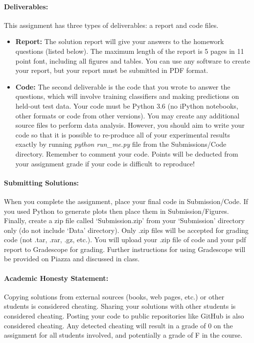 \documentclass[letterpaper]{article}
\begin{document}
\paragraph*{Deliverables:} This assignment has three types of deliverables: a report and code files. 
\begin{itemize}
\item \textbf{Report: } The solution report will give your answers to the homework questions (listed below). The maximum length of the report is 5 pages in 11 point font, including all figures and tables. You can use any software to create your report, but your report must be submitted in PDF format. 

\item \textbf{Code: } The second deliverable is the code that you wrote to answer the questions, which will involve training classifiers and making predictions on held-out test data. Your code must be Python 3.6 (no iPython notebooks, other formats or code from other versions). You may create any additional source files to perform data analysis. However, you should aim to write your code so that it is possible to re-produce all of your experimental results exactly by running \textit{python run\_me.py} file from the Submissions/Code directory. Remember to comment your code. Points will be deducted from your assignment grade if your code is difficult to reproduce!

\end{itemize}

\paragraph*{Submitting Solutions:} When you complete the assignment, place your final code in Submission/Code. If you used Python to generate plots then place them in Submission/Figures. Finally, create a zip file called `Submission.zip' from your `Submission' directory only (do not include `Data' directory). Only .zip files will be accepted for grading code (not .tar, .rar, .gz, etc.). You will upload your .zip file of code and your pdf report to Gradescope for grading. Further instructions for using Gradescope will be provided on Piazza and discussed in class.

\paragraph*{Academic Honesty Statement:} Copying solutions from external sources (books, web pages, etc.) or other students is considered cheating. Sharing your solutions with other students is  considered cheating. Posting your code to public repositories like GitHub is also considered cheating. Any detected cheating will result in a grade of 0 on the assignment for all students involved, and potentially a grade of F in the course.
\end{document}
